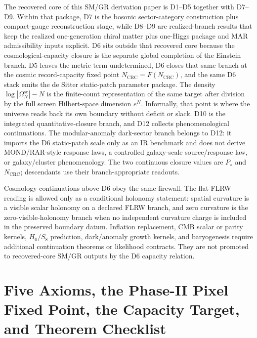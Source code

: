 \documentclass[11pt]{article}
\begin{document}
The recovered core of this SM/GR derivation paper is D1--D5 together with D7--D9. Within that package, D7 is the bosonic sector-category construction plus compact-gauge reconstruction stage, while D8--D9 are realized-branch results that keep the realized one-generation chiral matter plus one-Higgs package and MAR admissibility inputs explicit. D6 sits outside that recovered core because the cosmological-capacity closure is the separate global completion of the Einstein branch. D5 leaves the metric term undetermined, D6 closes that same branch at the cosmic record-capacity fixed point \(N_{\mathrm{CRC}}=F(N_{\mathrm{CRC}})\), and the same D6 stack emits the de Sitter static-patch parameter package. The density \(\log|\Omega^{\mathrm{sc}}_N|-N\) is the finite-count representation of the same target after division by the full screen Hilbert-space dimension \(e^N\). Informally, that point is where the universe reads back its own boundary without deficit or slack. D10 is the integrated quantitative-closure branch, and D12 collects phenomenological continuations. The modular-anomaly dark-sector branch belongs to D12: it imports the D6 static-patch scale only as an IR benchmark and does not derive MOND/RAR-style response laws, a controlled galaxy-scale source/response law, or galaxy/cluster phenomenology. The two continuous closure values are \(P_\star\) and \(N_{\mathrm{CRC}}\); descendants use their branch-appropriate readouts.

Cosmology continuations above D6 obey the same firewall. The flat-FLRW reading is allowed only as a
conditional holonomy statement: spatial curvature is a visible scalar holonomy on a declared FLRW
branch, and zero curvature is the zero-visible-holonomy branch when no independent curvature charge
is included in the preserved boundary datum. Inflation replacement, CMB scalar or parity kernels,
\(H_0/S_8\) prediction, dark/anomaly growth kernels, and baryogenesis require additional
continuation theorems or likelihood contracts. They are not promoted to recovered-core SM/GR
outputs by the D6 capacity relation.
\section{Five Axioms, the Phase-II Pixel Fixed Point, the Capacity Target, and Theorem Checklist}\label{sec:theorem-ledger}
\end{document}

